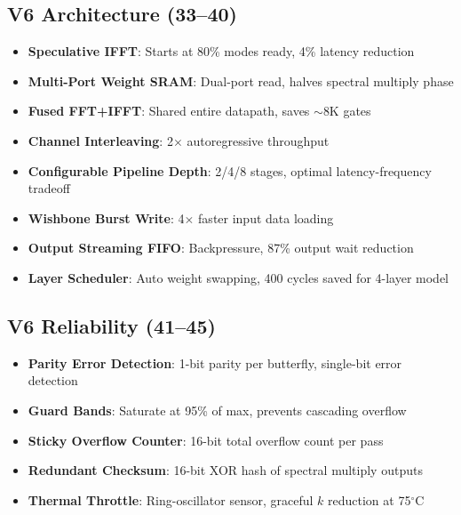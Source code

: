 \documentclass[11pt,a4paper]{article}
\theoremstyle{definition}
\theoremstyle{remark}
\begin{document}
\subsection{V6 Architecture (33--40)}
\begin{itemize}[noitemsep]
  \item \textbf{Speculative IFFT}: Starts at 80\% modes ready, 4\% latency reduction
  \item \textbf{Multi-Port Weight SRAM}: Dual-port read, halves spectral multiply phase
  \item \textbf{Fused FFT+IFFT}: Shared entire datapath, saves $\sim$8K gates
  \item \textbf{Channel Interleaving}: 2$\times$ autoregressive throughput
  \item \textbf{Configurable Pipeline Depth}: 2/4/8 stages, optimal latency-frequency tradeoff
  \item \textbf{Wishbone Burst Write}: 4$\times$ faster input data loading
  \item \textbf{Output Streaming FIFO}: Backpressure, 87\% output wait reduction
  \item \textbf{Layer Scheduler}: Auto weight swapping, 400 cycles saved for 4-layer model
\end{itemize}

\subsection{V6 Reliability (41--45)}
\begin{itemize}[noitemsep]
  \item \textbf{Parity Error Detection}: 1-bit parity per butterfly, single-bit error detection
  \item \textbf{Guard Bands}: Saturate at 95\% of max, prevents cascading overflow
  \item \textbf{Sticky Overflow Counter}: 16-bit total overflow count per pass
  \item \textbf{Redundant Checksum}: 16-bit XOR hash of spectral multiply outputs
  \item \textbf{Thermal Throttle}: Ring-oscillator sensor, graceful $k$ reduction at 75$^\circ$C
\end{itemize}
\end{document}
